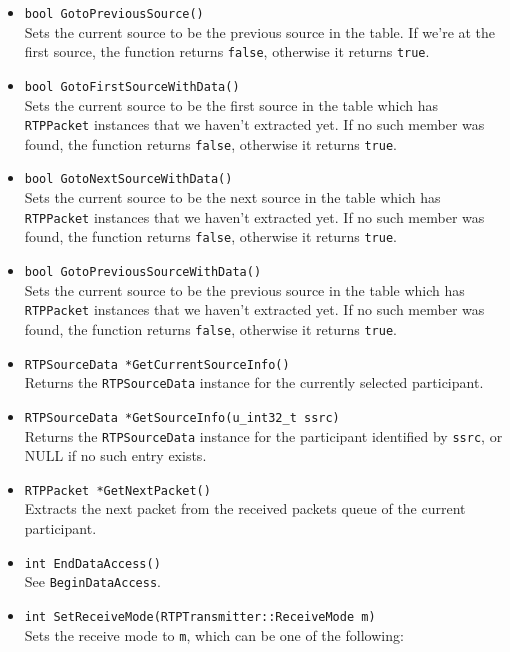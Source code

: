 \documentclass[12pt,a4paper]{article}
\begin{document}
\begin{itemize}
					\item {\tt bool GotoPreviousSource()}\\
						Sets the current source to be the previous source in the table.
						If we're at the first source, the function returns
						{\tt false}, otherwise it returns {\tt true}.
					\item {\tt bool GotoFirstSourceWithData()}\\
						Sets the current source to be the first source in the table
						which has {\tt RTPPacket} instances that we haven't extracted
						yet. If no such member was found, the function returns {\tt false},
						otherwise it returns {\tt true}.
					\item {\tt bool GotoNextSourceWithData()}\\
						Sets the current source to be the next source in the table
						which has {\tt RTPPacket} instances that we haven't extracted
						yet. If no such member was found, the function returns {\tt false},
						otherwise it returns {\tt true}.
					\item {\tt bool GotoPreviousSourceWithData()}\\
						Sets the current source to be the previous source in the table
						which has {\tt RTPPacket} instances that we haven't extracted
						yet. If no such member was found, the function returns {\tt false},
						otherwise it returns {\tt true}.
					\item {\tt RTPSourceData *GetCurrentSourceInfo()}\\
						Returns the {\tt RTPSourceData} instance for the currently
						selected participant.
					\item {\tt RTPSourceData *GetSourceInfo(u\_int32\_t ssrc)}\\
						Returns the {\tt RTPSourceData} instance for the participant
						identified by {\tt ssrc}, or NULL if no such entry exists.
					\item {\tt RTPPacket *GetNextPacket()}\\
						Extracts the next packet from the received packets queue
						of the current participant.
					\item {\tt int EndDataAccess()}\\
						See {\tt BeginDataAccess}.
					\item {\tt int SetReceiveMode(RTPTransmitter::ReceiveMode m)}\\
						Sets the receive mode to {\tt m}, which can be one of the
						following:
						\begin{itemize}

\end{itemize}
\end{itemize}
\end{document}
